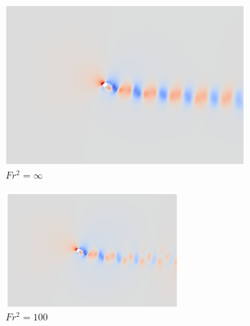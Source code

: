 \begin{figure}
    \centering
    \begin{subfigure}[b]{0.32\textwidth}
        \centering
        \includegraphics[width=\textwidth]{images/spinning_ellipse/ar1p5fsinf.png}
        \caption{$Fr^2 = \infty$}
        \label{fig:ar1p5fsinf}
    \end{subfigure}
    \hfill
    \begin{subfigure}[b]{0.32\textwidth}
        \centering
        \includegraphics[width=\textwidth]{images/spinning_ellipse/ar1p5fr10.png}
        \caption{$Fr^2 = 100$}
        \label{fig:ar1p5fr10}
    \end{subfigure}
    \hfill
    \begin{subfigure}[b]{0.32\textwidth}
        \centering

\end{subfigure}
\end{figure}
